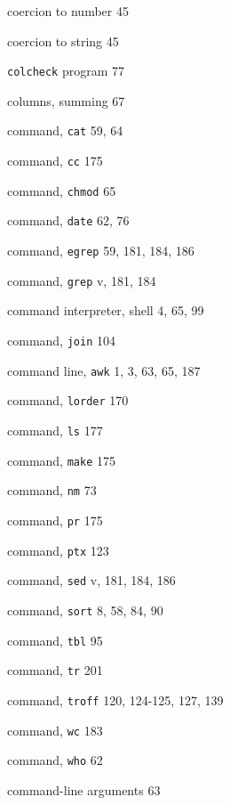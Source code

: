 \begin{multicols}{3}
\hangindent=4pc  coercion to number 45

\hangindent=4pc  coercion to string 45

\hangindent=4pc  \verb'colcheck' program 77

\hangindent=4pc  columns, summing 67

\hangindent=4pc  command, \verb'cat' 59, 64

\hangindent=4pc  command, \verb'cc' 175

\hangindent=4pc  command, \verb'chmod' 65

\hangindent=4pc  command, \verb'date' 62, 76

\hangindent=4pc  command, \verb'egrep' 59, 181, 184,  186

\hangindent=4pc  command, \verb'grep' v, 181, 184

\hangindent=4pc  command interpreter, shell 4, 65,  99

\hangindent=4pc  command, \verb'join' 104

\hangindent=4pc  command line, \verb'awk' 1, 3, 63, 65, 187

\hangindent=4pc  command, \verb'lorder' 170

\hangindent=4pc  command, \verb'ls' 177

\hangindent=4pc  command, \verb'make' 175

\hangindent=4pc  command, \verb'nm' 73

\hangindent=4pc  command, \verb'pr' 175

\hangindent=4pc  command, \verb'ptx' 123

\hangindent=4pc  command, \verb'sed' v, 181, 184, 186

\hangindent=4pc  command, \verb'sort' 8, 58, 84, 90

\hangindent=4pc  command, \verb'tbl' 95

\hangindent=4pc  command, \verb'tr' 201

\hangindent=4pc  command, \verb'troff' 120, 124-125, 127, 139

\hangindent=4pc  command, \verb'wc' 183


\hangindent=4pc  command, \verb'who' 62

\hangindent=4pc  command-line arguments 63


\end{multicols}
